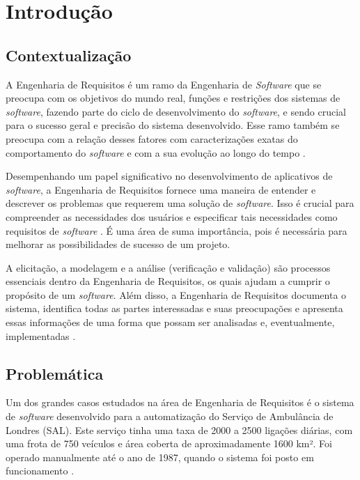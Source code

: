 \chapter[Introdução]{Introdução}

\section{Contextualização}

A Engenharia de Requisitos é um ramo da Engenharia de \textit{Software} que se preocupa com os objetivos do mundo real, funções e restrições dos sistemas de \textit{software}, fazendo parte do ciclo de desenvolvimento do \textit{software}, e sendo crucial para o sucesso geral e precisão do sistema desenvolvido. Esse ramo também se preocupa com a relação desses fatores com caracterizações exatas do comportamento do \textit{software} e com a sua evolução ao longo do tempo \cite{elliott2012software}.

Desempenhando um papel significativo no desenvolvimento de aplicativos de \textit{software}, a Engenharia de Requisitos fornece uma maneira de entender e descrever os problemas que requerem uma solução de \textit{software}. Isso é crucial para compreender as necessidades dos usuários e especificar tais necessidades como requisitos de \textit{software} \cite{elliott2012software}. É uma área de suma importância, pois é necessária para melhorar as possibilidades de sucesso de um projeto.

A elicitação, a modelagem e a análise (verificação e validação) são processos essenciais dentro da Engenharia de Requisitos, os quais ajudam a cumprir o propósito de um \textit{software}. Além disso, a Engenharia de Requisitos documenta o sistema, identifica todas as partes interessadas e suas preocupações e apresenta essas informações de uma forma que possam ser analisadas e, eventualmente, implementadas \cite{elliott2012software}.

\section{Problemática}
    
Um dos grandes casos estudados na área de Engenharia de Requisitos é o sistema de \textit{software} desenvolvido para a automatização do Serviço de Ambulância de Londres (SAL). Este serviço tinha uma taxa de 2000 a 2500 ligações diárias, com uma frota de 750 veículos e área coberta de aproximadamente 1600 km². Foi operado manualmente até o ano de 1987, quando o sistema foi posto em funcionamento \cite{LodonFiasco}.

